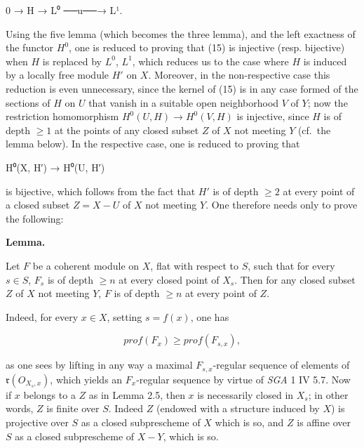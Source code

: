 \documentclass[
]{article}
\newenvironment{Shaded}{}{}
\newcommand{\NormalTok}[1]{#1}
\begin{document}
\begin{Shaded}
\begin{Highlighting}[]
\NormalTok{0 → H → L⁰ ──u──→ L¹.}
\end{Highlighting}
\end{Shaded}

Using the five lemma (which becomes the three lemma), and the left
exactness of the functor \(H^{0}\), one is reduced to proving that (15)
is injective (resp. bijective) when \(H\) is replaced by \(L^{0}\),
\(L^{1}\), which reduces us to the case where \(H\) is induced by a
locally free module \(H'\) on \(X\). Moreover, in the non-respective
case this reduction is even unnecessary, since the kernel of (15) is in
any case formed of the sections of \(H\) on \(U\) that vanish in a
suitable open neighborhood \(V\) of \(Y\); now the restriction
homomorphism \(H^{0}(U, H) \to H^{0}(V, H)\) is injective, since \(H\)
is of depth \(\geqslant 1\) at the points of any closed subset \(Z\) of
\(X\) not meeting \(Y\) (cf.~the lemma below). In the respective case,
one is reduced to proving that

\begin{Shaded}
\begin{Highlighting}[]
\NormalTok{H⁰(X, H′) → H⁰(U, H′)}
\end{Highlighting}
\end{Shaded}

is bijective, which follows from the fact that \(H'\) is of depth
\(\geqslant 2\) at every point of a closed subset \(Z = X - U\) of \(X\)
not meeting \(Y\). One therefore needs only to prove the following:

\textbf{Lemma.}

Let \(F\) be a coherent module on \(X\), flat with respect to \(S\),
such that for every \(s \in S\), \(F_{s}\) is of depth \(\geqslant n\)
at every closed point of \(X_{s}\). Then for any closed subset \(Z\) of
\(X\) not meeting \(Y\), \(F\) is of depth \(\geqslant n\) at every
point of \(Z\).

Indeed, for every \(x \in X\), setting \(s = f(x)\), one has

\[
prof(F_{x}) \geqslant prof(F_{s,x}),
\]

as one sees by lifting in any way a maximal \(F_{s,x}\)-regular sequence
of elements of \(\mathfrak{r}(O_{X_{s},x})\), which yields an
\(F_{x}\)-regular sequence by virtue of \emph{SGA} 1 IV 5.7. Now if
\(x\) belongs to a \(Z\) as in Lemma 2.5, then \(x\) is necessarily
closed in \(X_{s}\); in other words, \(Z\) is finite over \(S\). Indeed
\(Z\) (endowed with a structure induced by \(X\)) is projective over
\(S\) as a closed subprescheme of \(X\) which is so, and \(Z\) is affine
over \(S\) as a closed subprescheme of \(X - Y\), which is so.
\end{document}
